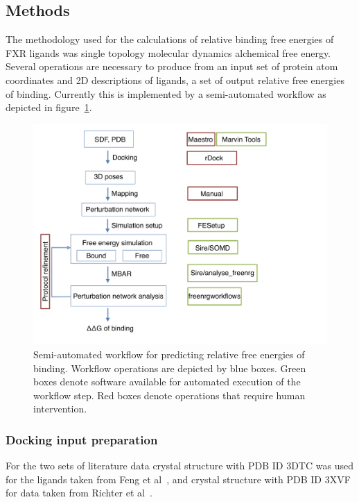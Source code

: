 \documentclass{svjour3}                     %
\begin{document}
\subsection{Methods}
\label{sec:methods}

The methodology used for the calculations of relative binding free energies of FXR ligands was single topology molecular dynamics alchemical free energy. Several operations are necessary to produce from an input set of protein atom coordinates and 2D descriptions of ligands, a set of output relative free energies of binding. Currently this is implemented by a semi-automated workflow as depicted in figure~\ref{fig:fig1}.   



\begin{figure}
\includegraphics[width=\textwidth]{Diagram_1.pdf}
\caption{Semi-automated workflow for predicting relative free energies of binding. Workflow operations are depicted by blue boxes. Green boxes denote software available for automated execution of the workflow step. Red boxes denote operations that require human intervention.}
\label{fig:fig1}
\end{figure}


\subsubsection{Docking input preparation}

For the two sets of literature data crystal structure with PDB ID 3DTC was used for the ligands taken from Feng et al~\cite{FengYangZhangEtAl2009}, and crystal structure with PDB ID 3XVF for data taken from Richter et al~\cite{RichterBensonBleicherEtAl2011}. 
\end{document}
